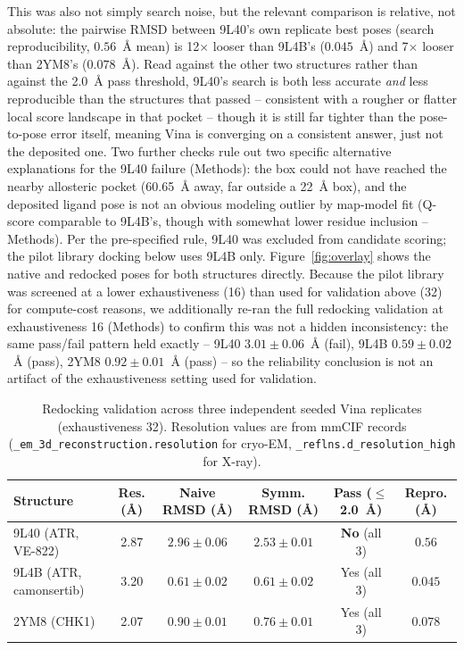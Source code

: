 \documentclass[11pt]{article}
\begin{document}
This was also not simply search noise, but the relevant comparison is
relative, not absolute: the pairwise RMSD between 9L40's own replicate best
poses (search reproducibility, $0.56$~{\AA} mean) is 12$\times$ looser than
9L4B's ($0.045$~{\AA}) and 7$\times$ looser than 2YM8's ($0.078$~{\AA}).
Read against the other two structures rather than against the 2.0~{\AA}
pass threshold, 9L40's search is both less accurate \emph{and} less
reproducible than the structures that passed -- consistent with a rougher
or flatter local score landscape in that pocket -- though it is still far
tighter than the pose-to-pose error itself, meaning Vina is converging on
a consistent answer, just not the deposited one. Two further checks rule
out two specific alternative explanations for the 9L40 failure (Methods):
the box could not have reached the nearby allosteric pocket (60.65~{\AA}
away, far outside a 22~{\AA} box), and the deposited ligand pose is not an
obvious modeling outlier by map-model fit (Q-score comparable to 9L4B's,
though with somewhat lower residue inclusion -- Methods). Per the
pre-specified rule, 9L40 was excluded from candidate scoring; the pilot
library docking below uses 9L4B only. Figure~\ref{fig:overlay} shows the
native and redocked poses for both structures directly. Because the pilot
library was screened at a lower exhaustiveness (16) than used for
validation above (32) for compute-cost reasons, we additionally re-ran the
full redocking validation at exhaustiveness 16 (Methods) to confirm this
was not a hidden inconsistency: the same pass/fail pattern held exactly --
9L40 $3.01\pm0.06$~{\AA} (fail), 9L4B $0.59\pm0.02$~{\AA} (pass), 2YM8
$0.92\pm0.01$~{\AA} (pass) -- so the reliability conclusion is not an
artifact of the exhaustiveness setting used for validation.

\begin{table}[htbp]
\centering
\small
\setlength{\tabcolsep}{4pt}
\caption{Redocking validation across three independent seeded Vina replicates (exhaustiveness 32). Resolution values are from mmCIF records (\texttt{\_em\_3d\_}\allowbreak\texttt{reconstruction.resolution} for cryo-EM, \texttt{\_reflns.d\_}\allowbreak\texttt{resolution\_high} for X-ray).}
\label{tab:redocking}
\begin{tabular}{@{}lccccc@{}}
\toprule
Structure & Res. ({\AA}) & Naive RMSD ({\AA}) & Symm. RMSD ({\AA}) & Pass ($\leq$2.0~{\AA}) & Repro. ({\AA}) \\
\midrule
9L40 (ATR, VE-822)      & 2.87 & $2.96 \pm 0.06$ & $2.53 \pm 0.01$ & \textbf{No} (all 3) & $0.56$ \\
9L4B (ATR, camonsertib) & 3.20 & $0.61 \pm 0.02$ & $0.61 \pm 0.02$ & Yes (all 3)         & $0.045$ \\
2YM8 (CHK1)             & 2.07 & $0.90 \pm 0.01$ & $0.76 \pm 0.01$ & Yes (all 3)         & $0.078$ \\
\bottomrule
\end{tabular}
\end{table}
\end{document}
